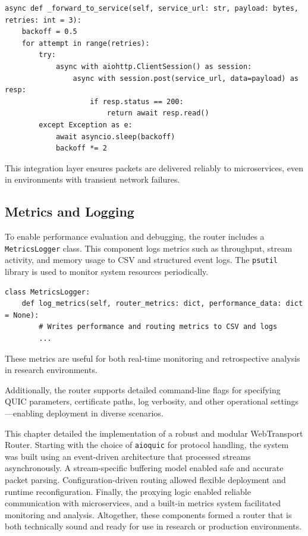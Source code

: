 \begin{lstlisting}
async def _forward_to_service(self, service_url: str, payload: bytes, retries: int = 3):
    backoff = 0.5
    for attempt in range(retries):
        try:
            async with aiohttp.ClientSession() as session:
                async with session.post(service_url, data=payload) as resp:
                    if resp.status == 200:
                        return await resp.read()
        except Exception as e:
            await asyncio.sleep(backoff)
            backoff *= 2
\end{lstlisting}

This integration layer ensures packets are delivered reliably to microservices, even in environments with transient network failures.

\subsection{Metrics and Logging}

To enable performance evaluation and debugging, the router includes a \texttt{MetricsLogger} class. This component logs metrics such as throughput, stream activity, and memory usage to CSV and structured event logs. The \texttt{psutil} library is used to monitor system resources periodically.

\begin{lstlisting}
class MetricsLogger:
    def log_metrics(self, router_metrics: dict, performance_data: dict = None):
        # Writes performance and routing metrics to CSV and logs
        ...
\end{lstlisting}

These metrics are useful for both real-time monitoring and retrospective analysis in research environments.

Additionally, the router supports detailed command-line flags for specifying QUIC parameters, certificate paths, log verbosity, and other operational settings—enabling deployment in diverse scenarios.


This chapter detailed the implementation of a robust and modular WebTransport Router. Starting with the choice of \texttt{aioquic} for protocol handling, the system was built using an event-driven architecture that processed streams asynchronously. A stream-specific buffering model enabled safe and accurate packet parsing. Configuration-driven routing allowed flexible deployment and runtime reconfiguration. Finally, the proxying logic enabled reliable communication with microservices, and a built-in metrics system facilitated monitoring and analysis. Altogether, these components formed a router that is both technically sound and ready for use in research or production environments.
















